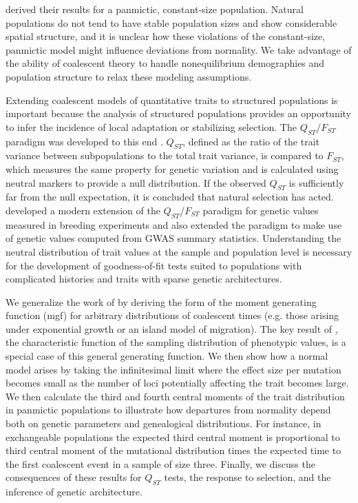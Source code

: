 \citet{Schraiber2015} derived their results for a panmictic, constant-size
population. Natural populations do not tend to have stable population sizes and
show considerable spatial structure, and it is unclear how these violations of
the constant-size, panmictic model might influence deviations from normality. We
take advantage of the ability of coalescent theory to handle nonequilibrium
demographies and population structure to relax these modeling assumptions.

Extending coalescent models of quantitative traits to structured populations is
important because the analysis of structured populations provides an opportunity
to infer the incidence of local adaptation or stabilizing selection. The
$Q_{ST}$/$F_{ST}$ paradigm was developed to this end
\citep{Whitlock2008,Spitze1993}. $Q_{ST}$, defined as the ratio of the trait
variance between subpopulations to the total trait variance, is compared to
$F_{ST}$, which measures the same property for genetic variation and is
calculated using neutral markers to provide a null distribution. If the observed
$Q_{ST}$ is sufficiently far from the null expectation, it is concluded that
natural selection has acted. \citet{Ovaskainen2011} developed a modern extension
of the $Q_{ST}$/$F_{ST}$ paradigm for genetic values measured in breeding
experiments and \citet{Berg2014} also extended the paradigm to make use of
genetic values computed from GWAS summary statistics. Understanding the neutral
distribution of trait values at the sample and population level is necessary for
the development of goodness-of-fit tests suited to populations with complicated
histories and traits with sparse genetic architectures.

We generalize the work of \citet{Schraiber2015} by deriving the form of the
moment generating function (mgf) for arbitrary distributions of coalescent times
(e.g. those arising under exponential growth or an island model of migration).
The key result of \citet{Schraiber2015}, the characteristic function of the
sampling distribution of phenotypic values, is a special case of this general
generating function. We then show how a normal model arises by taking the
infinitesimal limit where the effect size per mutation becomes small as the
number of loci potentially affecting the trait becomes large. We then calculate
the third and fourth central moments of the trait distribution in panmictic
populations to illustrate how departures from normality depend both on genetic
parameters and genealogical distributions. For instance, in exchangeable
populations the expected third central moment is proportional to third central
moment of the mutational distribution times the expected time to the first
coalescent event in a sample of size three. Finally, we discuss the consequences
of these results for $Q_{ST}$ tests, the response to selection, and the
inference of genetic architecture.

